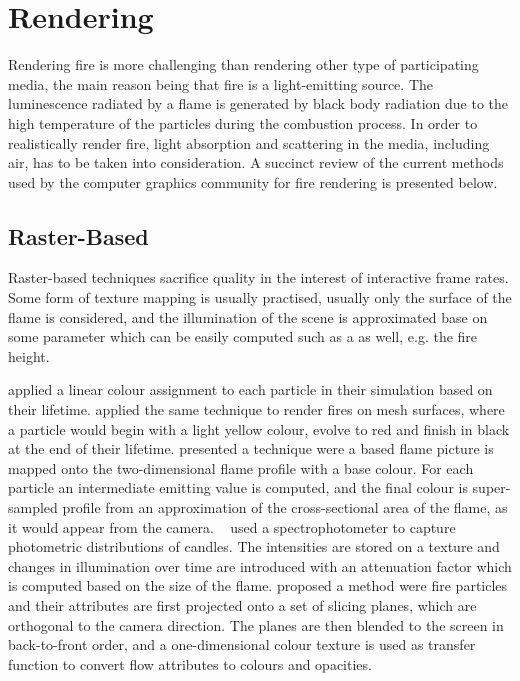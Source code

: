 \section{Rendering}
\label{sec:rendering}

Rendering fire is more challenging than rendering other type of participating media, the main reason being that fire is a light-emitting source.
The luminescence radiated by a flame is generated by black body radiation due to the high temperature of the particles during the combustion process.
In order to realistically render fire, light absorption and scattering in the media, including air, has to be taken into consideration.
A succinct review of the current methods used by the computer graphics community for fire rendering is presented below.

\subsection{Raster-Based}
\label{sec:raster_based}

Raster-based techniques sacrifice quality in the interest of interactive frame rates.
Some form of texture mapping is usually practised, usually only the surface of the flame is considered, and the illumination of the scene is approximated base on some parameter which can be easily computed such as a as well, e.g. the fire height.

\cite{Reeves:1983} applied a linear colour assignment to each particle in their simulation based on their lifetime.
\cite{Lee:2001} applied the same technique to render fires on mesh surfaces, where a particle would begin with a light yellow colour, evolve to red and finish in black at the end of their lifetime.
\cite{Lamorlette:2002} presented a technique were a based flame picture is mapped onto the two-dimensional flame profile with a base colour.
For each particle an intermediate emitting value is computed, and the final colour is super-sampled profile from an approximation of the cross-sectional area of the flame, as it would appear from the camera.
~\cite{Bridault:2006} used a spectrophotometer to capture photometric distributions of candles.
The intensities are stored on a texture and changes in illumination over time are introduced with an attenuation factor which is computed based on the size of the flame.
\cite{Zhang:2011} proposed a method were fire particles and their attributes are first projected onto a set of slicing planes, which are orthogonal to the camera direction. 
The planes are then blended to the screen in back-to-front order, and a one-dimensional colour texture is used as transfer function to convert flow attributes to colours and opacities.


